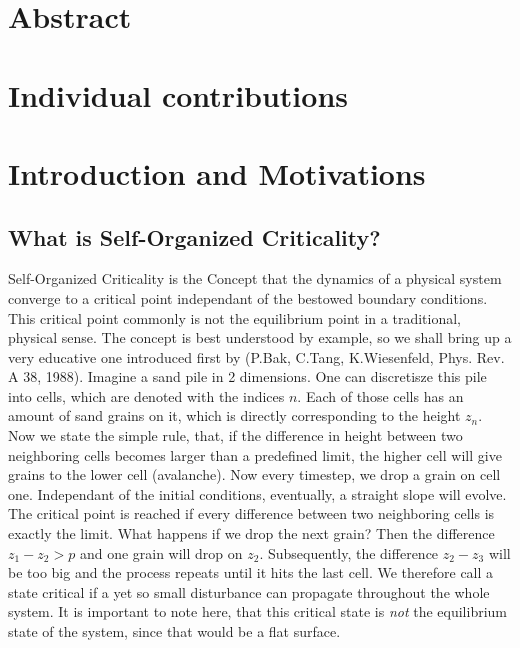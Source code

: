 \documentclass[11pt]{article}
\begin{document}



\section{Abstract}

\section{Individual contributions}

\section{Introduction and Motivations}
\subsection{What is Self-Organized Criticality?}
Self-Organized Criticality is the Concept that the dynamics of a physical system converge to a critical point independant of the bestowed boundary conditions. This critical point commonly is not the equilibrium point in a traditional, physical sense. The concept is best understood by example, so we shall bring up a very educative one introduced first by (P.Bak, C.Tang, K.Wiesenfeld, Phys. Rev. A 38, 1988). 
Imagine a sand pile in 2 dimensions. One can discretisze this pile into cells, which are denoted with the indices $n$. Each of those cells has an amount of sand grains on it, which is directly corresponding to the height $z_{n}$. Now we state the simple rule, that, if the difference in height between two neighboring cells becomes larger than a predefined limit, the higher cell will give grains to the lower cell (avalanche). Now every timestep, we drop a grain on cell one. Independant of the initial conditions, eventually, a straight slope will evolve. The critical point is reached if every difference between two neighboring cells is exactly the limit. What happens if we drop the next grain? Then the difference $z_{1}-z_{2}>p$ and one grain will drop on $z_{2}$. Subsequently, the difference $z_{2}-z_{3}$ will be too big and the process repeats until it hits the last cell. We therefore call a state critical if a yet so small disturbance can propagate throughout the whole system.
It is important to note here, that this critical state is \emph{not} the equilibrium state of the system, since that would be a flat surface. 
\end{document}
